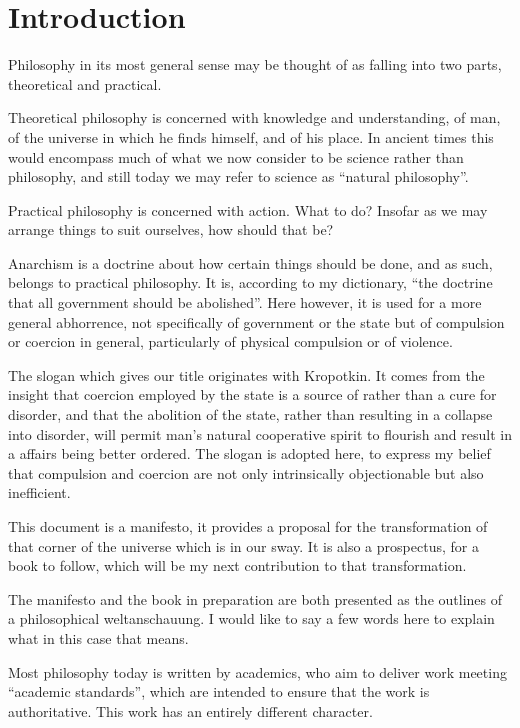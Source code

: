 \section{Introduction}\label{Introduction}

Philosophy in its most general sense may be thought of as falling into two parts, theoretical and practical.

Theoretical philosophy is concerned with knowledge and understanding, of man, of the universe in which he finds himself, and of his place.
In ancient times this would encompass much of what we now consider to be science rather than philosophy, and still today we may refer to science as ``natural philosophy''.

Practical philosophy is concerned with action.
What to do?
Insofar as we may arrange things to suit ourselves, how should that be?

Anarchism is a doctrine about how certain things should be done, and as such, belongs to practical philosophy.
It is, according to my dictionary, ``the doctrine that all government should be abolished''.
Here however, it is used for a more general abhorrence, not specifically of government or the state but of compulsion or coercion in general, particularly of physical compulsion or of violence.

The slogan which gives our title originates with Kropotkin.
It comes from the insight that coercion employed by the state is a source of rather than a cure for disorder, and that the abolition of the state, rather than resulting in a collapse into disorder, will permit man's natural cooperative spirit to flourish and result in a affairs being better ordered.
The slogan is adopted here, to express my belief that compulsion and coercion are not only intrinsically objectionable but also inefficient.

This document is a manifesto, it provides a proposal for the transformation of that corner of the universe which is in our sway.
It is also a prospectus, for a book to follow, which will be my next contribution to that transformation.

The manifesto and the book in preparation are both presented as the outlines of a philosophical weltanschauung.
I would like to say a few words here to explain what in this case that means.

Most philosophy today is written by academics, who aim to deliver work meeting ``academic standards'', which are intended to ensure that the work is authoritative.
This work has an entirely different character.

